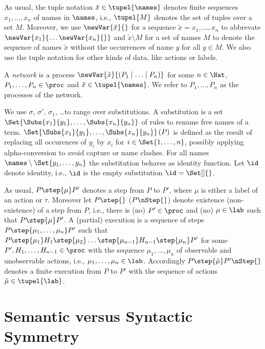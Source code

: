 \documentclass[11pt,techReport]{eptcs}
\begin{document}
As usual, the tuple notation $ \tilde{x} \in \tupel{\names} $ denotes finite sequences $x_1,\ldots,x_n$ of names in $\names$, i.e., $ \tupel{M} $ denotes the set of tuples over a set $ M $. Moreover, we use $ \newVar{\tilde{x}}{} $ for a sequence $ \tilde{x} = x_1, \ldots, x_n $ to abbrevate $ \newVar{x_1}{\ldots \newVar{x_n}{}} $ and $ \tilde{x} \setminus M $ for a set of names $ M $ to denote the sequence of names $ \tilde{x} $ without the occurrences of name $ y $ for all $ y \in M $. We also use the tuple notation for other kinds of data, like actions or labels.

A \emph{network} is a process $ \newVar{\tilde{x}}{\left( P_1 \mid \ldots \mid P_n \right)} $ for some $ n \in \Nat $, $ P_1, \ldots, P_n \in \proc $ and $ \tilde{x} \in \tupel{\names} $. We refer to $ P_1, \ldots, P_n $ as the processes of the network.

We use $ \sigma $, $ \sigma' $, $ \sigma_1 $, \ldots to range over substitutions. A substitution is a set $ \Set{ \Subs{x_1}{y_1}, \ldots, \Subs{x_n}{y_n} } $ of rules to rename free names of a term. $ \Set{ \Subs{x_1}{y_1}, \ldots, \Subs{x_n}{y_n} }\left( P \right) $ is defined as the result of replacing all occurences of $ y_i $ by $ x_i $ for $ i \in \Set{ 1, \ldots, n } $, possibly applying alpha-conversion to avoid capture or name clashes. For all names $ \names \setminus \Set{ y_1, \ldots, y_n } $ the substitution behaves as identity function. Let $ \id $ denote identity, i.e., $ \id $ is the empty substitution $ \id = \Set[]{ } $.

As usual, $ P \step{\mu} P' $ denotes a step from $ P $ to $ P' $, where $ \mu $ is either a label of an action or $ \tau $. Moreover let $ P \step{} $ ($ P \nStep{} $) denote existence (non-existence) of a step from $ P $, i.e., there is (no) $ P' \in \proc $ and (no) $ \mu \in \lab $ such that $ P \step{\mu} P' $. A (partial) execution is a sequence of steps $ P \step{\mu_1, \ldots, \mu_n} P' $ such that $ P \step{\mu_1} H_1 \step{\mu_2} \ldots \step{\mu_{n{-}1}} H_{n-1} \step{\mu_n} P' $ for some $ P', H_1, \ldots, H_{n{-}1} \in \proc $ with the sequence $ \mu_1, \ldots, \mu_n $ of observable and unobservable actions, i.e., $ \mu_1, \ldots, \mu_n \in \lab $. Accordingly $ P \step{\tilde{\mu}} P' \nStep{} $ denotes a finite execution from $ P $ to $ P' $ with the sequence of actions $ \tilde{\mu} \in \tupel{\lab} $.




\section{Semantic versus Syntactic Symmetry} \label{sec:SemanticVsSyntactic}
\end{document}

